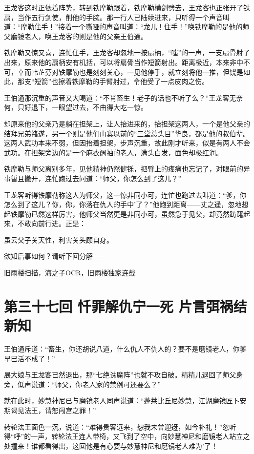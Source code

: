 \documentclass[12pt,oneside]{book}
\begin{document}
王龙客这时正依着阵势，转到铁摩勒跟着，铁摩勒横剑劈去，王龙客也正张开了铁扇，当作五行剑使，削他的手腕。那一行人已陆续进来，只听得一个声音叫道：``摩勒住手！''接着一个嘶哑的声音叫道：``龙儿！住手！''唤铁摩勒的是他的师父磨镜老人，唤王龙客的则是他的父亲王伯通。

铁摩勒又惊又喜，连忙住手，王龙客却忽地一按扇柄，``嗤''的一声，一支扇骨射了出来，原来他的扇柄安有机括，可以将扇骨当作短箭射出。距离极近，本来非中不可，幸而韩芷芬对铁摩勒也是刻刻关心，一见他停手，就立刻将他一推，但饶是如此，那支``短箭''也擦着铁摩勒的手臂射过，令他受了一点皮肉之伤。

王伯通那沉重的声音又大喝道：``不肖畜生！老子的话也不听了么？''王龙客无奈何，只好退下，一眼望过去，不由得大吃一惊。

却原来他的父亲乃是躺在担架上，让人抬进来的，抬担架这两人，一个是他父亲的结拜兄弟褚遂，另一个则是他们山寨以前的``三堂总头目''华良，都是他的叔伯辈。这两人武功本来不弱，但因抬着担架，步声沉重，故此刚才听来，似是有两人不会武功。在担架旁边的是一个麻衣阔袖的老人，满头白发，面色却极红润。

铁摩勒与师父离别多年，见他精神仍然健铄，把臂上的疼痛也忘记了，对眼前的异事暂且撇开，连忙跑过去问道：``师父，你怎么到了这儿？''

王龙客听得铁摩勒称这人为师父，这一惊非同小可，连忙也跑过去叫道：``爹，你怎么到了这儿？你，你，你落在仇人的手中'了？''他跑到距离------丈之遥，忽地想起铁摩勒已然这样厉害，他师父当然更是非同小可，虽然急于见父，却竟然踌躇起来，不敢向前行进。正是：

虽云父子关天性，利害关头顾自身。

欲知后事如何？请听下回分解------

旧雨楼扫描，海之子OCR，旧雨楼独家连载

\chapter{第三十七回 忏罪解仇宁一死
片言弭祸结新知}\label{ux7b2cux4e09ux5341ux4e03ux56de-ux5fcfux7f6aux89e3ux4ec7ux5b81ux4e00ux6b7b-ux7247ux8a00ux5f2dux7978ux7ed3ux65b0ux77e5}

王伯通斥道：``畜生，你还胡说八道，什么仇人不仇人的？要不是磨镜老人，你爹早巳活不成了！''

展大娘与王龙客已然退出，那``七绝诛魔阵''也就不攻自破。精精儿退回了师父身旁，低声说道：``师父，你老人家的禁例可还要么？''

就在此时，妙慧神尼已与磨镜老人同声说道：``蓬莱比丘尼妙慧，江湖磨镜匠卜安期谒见法王，请恕闯宫之罪！''

转轮法王面色一沉，说道：``难得贵客远来，恕我未曾迎迓，如今补礼！''忽听得``呼''的一声，转轮法王连人带椅，又飞到了空中，向妙慧神尼和磨镜老人站立之处撞来！谁都看得出，这回他是有心要与妙慧神尼和磨镜老人难为'了！
\end{document}
